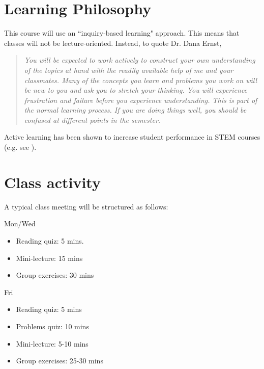 \documentclass[letterpaper]{inzane_syllabus} %
\begin{document}
\vspace{0.5cm} 
\section{Learning Philosophy}

This course will use an ``inquiry-based learning" approach. This means that classes will not be lecture-oriented. Instead, to quote Dr. Dana Ernst,

\begin{quotation}
\textit{You will be expected to work actively to construct your own understanding of the topics at hand with the readily available help of me and your classmates. Many of the concepts you learn and problems you work on will be new to you and ask you to stretch your thinking. You will experience frustration and failure before you experience understanding. This is part of the normal learning process. If you are doing things well, you should be confused at different points in the semester.}
\end{quotation}

Active learning has been shown to increase student performance in STEM courses (e.g. see \cite{deslauriers2011improved, freeman2014active}). 

\vspace{0.2cm}
\section{Class activity}

A typical class meeting will be structured as follows:

\noindent
\begin{minipage}{0.45\textwidth}
Mon/Wed
\begin{itemize}
\item Reading quiz: 5 mins.
\item Mini-lecture: 15 mins
\item Group exercises: 30 mins	
\end{itemize}
\end{minipage}
\hfill
\begin{minipage}{0.45\textwidth}
Fri
\begin{itemize}
\item Reading quiz: 5 mins
\item Problems quiz: 10 mins 
\item Mini-lecture: 5-10 mins
\item Group exercises: 25-30 mins
\end{itemize}
\end{minipage}
\end{document}
